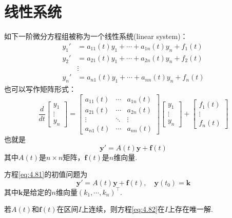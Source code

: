 \section{线性系统}

如下一阶微分方程组被称为一个线性系统(linear system)：
\begin{align*}
    y_1' & =a_{11}(t)y_1+\cdots+a_{1n}(t)y_n+f_1(t) \\
    y_2' & =a_{21}(t)y_1+\cdots+a_{2n}(t)y_n+f_2(t) \\
         & \vdots                                   \\
    y_n' & =a_{n1}(t)y_1+\cdots+a_{nn}(t)y_n+f_n(t)
\end{align*}
也可以写作矩阵形式：
\begin{equation}\label{eq:4.80}
    \frac{d}{dt}\begin{bmatrix}y_1\\\vdots\\y_n\end{bmatrix}=\begin{bmatrix}a_{11}(t)&\cdots&a_{1n}(t)\\a_{21}(t)&\cdots&a_{2n}(t)\\\vdots&\ddots&\vdots\\a_{n1}(t)&\cdots&a_{nn}(t)\end{bmatrix}\begin{bmatrix}y_1\\\vdots\\y_n\end{bmatrix}+\begin{bmatrix}f_1(t)\\\vdots\\f_n(t)\end{bmatrix}
\end{equation}
也就是
\begin{equation}\label{eq:4.81}
    \mathbf{y}'=A(t)\mathbf{y}+\mathbf{f}(t)
\end{equation}
其中$A(t)$是$n\times n$矩阵，$\mathbf{f}(t)$是$n$维向量.

方程\ref{eq:4.81}的初值问题为
\begin{equation}\label{eq:4.82}
    \mathbf{y}'=A(t)\mathbf{y}+\mathbf{f}(t),\quad \mathbf{y}(t_0)=\mathbf{k}
\end{equation}
其中$\mathbf{k}$是给定的$n$维向量$(k_1,\cdots,k_n)^{\top}$.

\begin{theorem}
    若$A(t)$和$\mathbf{f}(t)$在区间$I$上连续，则方程\ref{eq:4.82}在$I$上存在唯一解.
\end{theorem}

